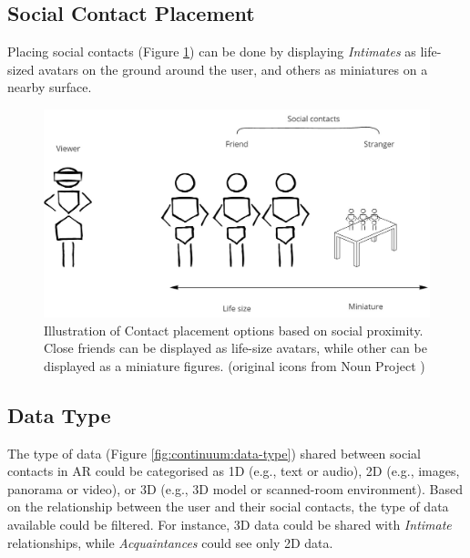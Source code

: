 \subsection{Social Contact Placement}

Placing social contacts (Figure \ref{fig:continuum:contact-placement}) can be done by displaying \textit{Intimates} as life-sized avatars on the ground around the user, and others as miniatures on a nearby surface. 

\begin{figure}[ht]
    \centering
    \includegraphics[width=0.8\linewidth]{images/30-continuum/Continuum-placement.jpg}
    \caption{Illustration of Contact placement options based on social proximity. Close friends can be displayed as life-size avatars, while other can be displayed as a miniature figures. (original icons from Noun Project \cite{TheNounProjectInc.})}
    \label{fig:continuum:contact-placement}
\end{figure}




\subsection{Data Type}

The type of data (Figure \ref{fig:continuum:data-type}) shared between social contacts in AR could be categorised as 1D (e.g., text or audio), 2D (e.g., images, panorama or video), or 3D (e.g., 3D model or scanned-room environment). Based on the relationship between the user and their social contacts, the type of data available could be filtered. For instance, 3D data could be shared with \textit{Intimate} relationships, while \textit{Acquaintances} could see only 2D data.  


